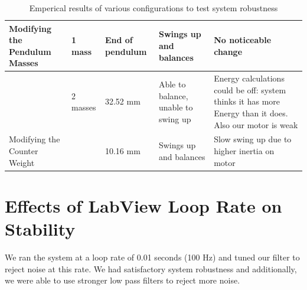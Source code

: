 \documentclass{article}
\theoremstyle{plain}
\theoremstyle{definition}
\theoremstyle{remark}
\begin{document}
\begin{table}[htb]
\begin{center}
\begin{tabular}{|p{2.5cm}||p{3cm}|p{2cm}|p{2.5cm}|p{6cm}|}
        Modifying the Pendulum Masses & 1 mass                             & End of pendulum       & Swings up and balances              & No noticeable change                                                                                     \\ \hline
        ~                             & 2 masses                           & 32.52 mm              & Able to balance, unable to swing up & Energy calculations could be off: system thinks it has more Energy than it does. Also our motor is weak \\ \hline\hline
        Modifying the Counter Weight  & ~                                  & 10.16 mm              & Swings up and balances              & Slow swing up due to higher inertia on motor                                                             \\
        \hline \hline
    \end{tabular}
\end{center}
\caption{Emperical results of various configurations to test system robustness}
\label{q6_d_tab}
\end{table}

\clearpage
\section{Effects of LabView Loop Rate on Stability}
We ran the system at a loop rate of 0.01 seconds (100 Hz) and tuned our filter to reject noise at this rate. We had satisfactory system robustness and additionally, we were able to use stronger low pass filters to reject more noise.\\
\end{document}
